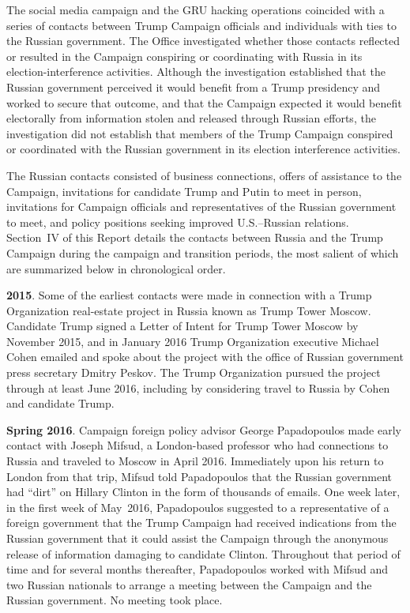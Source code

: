 The social media campaign and the GRU hacking operations coincided with a series of contacts between Trump Campaign officials and individuals with ties to the Russian government.
The Office investigated whether those contacts reflected or resulted in the Campaign conspiring or coordinating with Russia in its election-interference activities.
Although the investigation established that the Russian government perceived it would benefit from a Trump presidency and worked to secure that outcome, and that the Campaign expected it would benefit electorally from information stolen and released through Russian efforts, the investigation did not establish that members of the Trump Campaign conspired or coordinated with the Russian government in its election interference activities.

The Russian contacts consisted of business connections, offers of assistance to the Campaign, invitations for candidate Trump and Putin to meet in person, invitations for Campaign officials and representatives of the Russian government to meet, and policy positions seeking improved U.S.--Russian relations.
Section~IV of this Report details the contacts between Russia and the Trump Campaign during the campaign and transition periods, the most salient of which are summarized below in chronological order.

\textbf{2015}.
Some of the earliest contacts were made in connection with a Trump Organization real-estate project in Russia known as Trump Tower Moscow.
Candidate Trump signed a Letter of Intent for Trump Tower Moscow by November 2015, and in January 2016 Trump Organization executive Michael Cohen emailed and spoke about the project with the office of Russian government press secretary Dmitry Peskov.
The Trump Organization pursued the project through at least June 2016, including by considering travel to Russia by Cohen and candidate Trump.

\textbf{Spring 2016}.
Campaign foreign policy advisor George Papadopoulos made early contact with Joseph Mifsud, a London-based professor who had connections to Russia and traveled to Moscow in April 2016.
Immediately upon his return to London from that trip, Mifsud told Papadopoulos that the Russian government had ``dirt'' on Hillary Clinton in the form of thousands of emails.
One week later, in the first week of May~2016, Papadopoulos suggested to a representative of a foreign government that the Trump Campaign had received indications from the Russian government that it could assist the Campaign through the anonymous release of information damaging to candidate Clinton.
Throughout that period of time and for several months thereafter, Papadopoulos worked with Mifsud and two Russian nationals to arrange a meeting between the Campaign and the Russian government.
No meeting took place.

